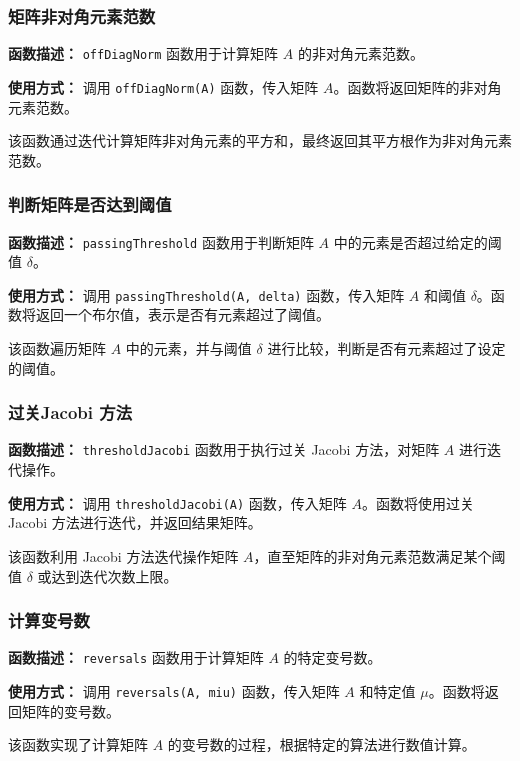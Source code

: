\documentclass{article}
\begin{document}
\subsubsection*{矩阵非对角元素范数}

\textbf{函数描述：} \texttt{offDiagNorm} 函数用于计算矩阵 $A$ 的非对角元素范数。

\textbf{使用方式：} 调用 \texttt{offDiagNorm(A)} 函数，传入矩阵 $A$。函数将返回矩阵的非对角元素范数。

该函数通过迭代计算矩阵非对角元素的平方和，最终返回其平方根作为非对角元素范数。

\subsubsection*{判断矩阵是否达到阈值}

\textbf{函数描述：} \texttt{passingThreshold} 函数用于判断矩阵 $A$ 中的元素是否超过给定的阈值 $\delta$。

\textbf{使用方式：} 调用 \texttt{passingThreshold(A, delta)} 函数，传入矩阵 $A$ 和阈值 $\delta$。函数将返回一个布尔值，表示是否有元素超过了阈值。

该函数遍历矩阵 $A$ 中的元素，并与阈值 $\delta$ 进行比较，判断是否有元素超过了设定的阈值。

\subsubsection*{过关Jacobi 方法}

\textbf{函数描述：} \texttt{thresholdJacobi} 函数用于执行过关 Jacobi 方法，对矩阵 $A$ 进行迭代操作。

\textbf{使用方式：} 调用 \texttt{thresholdJacobi(A)} 函数，传入矩阵 $A$。函数将使用过关 Jacobi 方法进行迭代，并返回结果矩阵。

该函数利用 Jacobi 方法迭代操作矩阵 $A$，直至矩阵的非对角元素范数满足某个阈值 $\delta$ 或达到迭代次数上限。

\subsubsection*{计算变号数}

\textbf{函数描述：} \texttt{reversals} 函数用于计算矩阵 $A$ 的特定变号数。

\textbf{使用方式：} 调用 \texttt{reversals(A, miu)} 函数，传入矩阵 $A$ 和特定值 $\mu$。函数将返回矩阵的变号数。

该函数实现了计算矩阵 $A$ 的变号数的过程，根据特定的算法进行数值计算。
\end{document}
